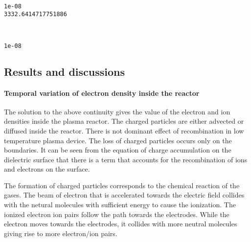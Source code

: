 \documentclass[11pt]{article}
\begin{document}
    \begin{center}
    \end{center}
    { \hspace*{\fill} \\}
    
    \begin{Verbatim}[commandchars=\\\{\}]
1e-08
3332.6414717751886

    \end{Verbatim}

    \begin{center}
    \end{center}
    { \hspace*{\fill} \\}
    
    \begin{Verbatim}[commandchars=\\\{\}]
1e-08

    \end{Verbatim}

    \subsection{Results and discussions}\label{results-and-discussions}

\paragraph{Temporal variation of electron density inside the
reactor}\label{temporal-variation-of-electron-density-inside-the-reactor}

The solution to the above continuity gives the value of the electron and
ion densities inside the plasma reactor. The charged particles are
either advected or diffused inside the reactor. There is not dominant
effect of recombination in low temperature plasma device. The loss of
charged particles occurs only on the boundaries. It can be seen from the
equation of charge accumulation on the dielectric surface that there is
a term that accounts for the recombination of ions and electrons on the
surface.

The formation of charged particles corresponds to the chemical reaction
of the gases. The beam of electron that is accelerated towards the
electric field collides with the netural molecules with sufficient
energy to cause the ionization. The ionized electron ion pairs follow
the path towards the electrodes. While the electron moves towards the
electrodes, it collides with more neutral molecules giving rise to more
electron/ion pairs.
\end{document}

